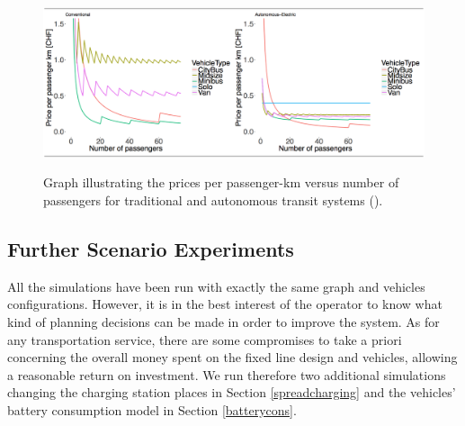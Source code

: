 \documentclass[12pt,a4paper]{article}
\begin{document}
 \begin{figure}[h] 
  \centering
  \caption{Graph illustrating the prices per passenger-km versus number of passengers for traditional and autonomous transit systems (\cite{ethz}).}
\includegraphics[scale=0.5]{./images/passengerperkmcost}
\label{passengerkm}
\end{figure}


\subsection{Further Scenario Experiments}\label{further}
All the simulations have been run with exactly the same graph and vehicles configurations. However, it is in the best interest of the operator to know what kind of planning decisions can be made in order to improve the system. As for any transportation service, there are some compromises to take a priori concerning the overall money spent on the fixed line design and vehicles, allowing a reasonable return on investment. We run therefore two additional simulations changing the charging station places in Section \ref{spreadcharging} and the vehicles' battery consumption model in Section \ref{batterycons}.
\end{document}
